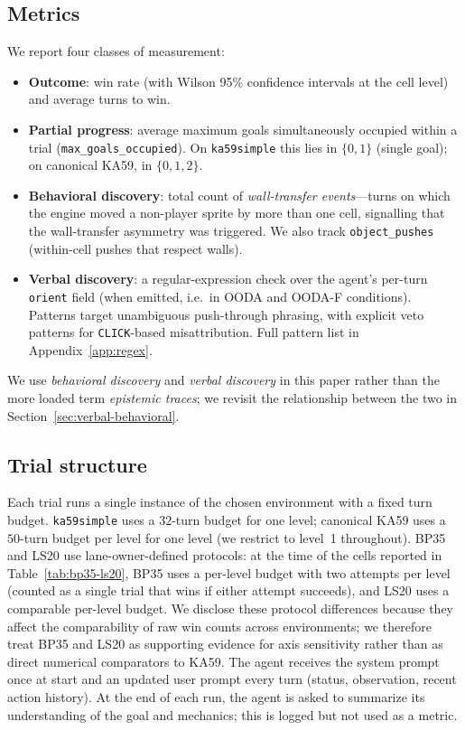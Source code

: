 \documentclass{article}
\begin{document}
\subsection{Metrics}
We report four classes of measurement:
\begin{itemize}
  \item \textbf{Outcome}: win rate (with Wilson 95\% confidence intervals at the cell level) and average turns to win.
  \item \textbf{Partial progress}: average maximum goals simultaneously occupied within a trial (\texttt{max\_goals\_occupied}). On \texttt{ka59simple} this lies in $\{0, 1\}$ (single goal); on canonical KA59, in $\{0, 1, 2\}$.
  \item \textbf{Behavioral discovery}: total count of \emph{wall-transfer events}---turns on which the engine moved a non-player sprite by more than one cell, signalling that the wall-transfer asymmetry was triggered. We also track \texttt{object\_pushes} (within-cell pushes that respect walls).
  \item \textbf{Verbal discovery}: a regular-expression check over the agent's per-turn \texttt{orient} field (when emitted, i.e.\ in OODA and OODA-F conditions). Patterns target unambiguous push-through phrasing, with explicit veto patterns for \texttt{CLICK}-based misattribution. Full pattern list in Appendix~\ref{app:regex}.
\end{itemize}
We use \emph{behavioral discovery} and \emph{verbal discovery} in this paper rather than the more loaded term \emph{epistemic traces}; we revisit the relationship between the two in Section~\ref{sec:verbal-behavioral}.

\subsection{Trial structure}
Each trial runs a single instance of the chosen environment with a fixed turn budget. \texttt{ka59simple} uses a $32$-turn budget for one level; canonical KA59 uses a $50$-turn budget per level for one level (we restrict to level~1 throughout). BP35 and LS20 use lane-owner-defined protocols: at the time of the cells reported in Table~\ref{tab:bp35-ls20}, BP35 uses a per-level budget with two attempts per level (counted as a single trial that wins if either attempt succeeds), and LS20 uses a comparable per-level budget. We disclose these protocol differences because they affect the comparability of raw win counts across environments; we therefore treat BP35 and LS20 as supporting evidence for axis sensitivity rather than as direct numerical comparators to KA59. The agent receives the system prompt once at start and an updated user prompt every turn (status, observation, recent action history). At the end of each run, the agent is asked to summarize its understanding of the goal and mechanics; this is logged but not used as a metric.
\end{document}
